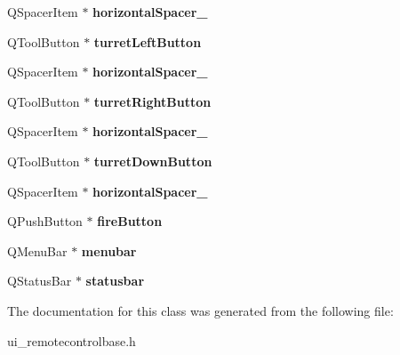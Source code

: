 \begin{DoxyCompactItemize}
\item 
\hypertarget{classUi__RemoteControlBase_ac94497ad40f449c39f453cabe81f50b5}{
QSpacerItem $\ast$ {\bfseries horizontalSpacer\_}}
\label{classUi__RemoteControlBase_ac94497ad40f449c39f453cabe81f50b5}

\item 
\hypertarget{classUi__RemoteControlBase_a1986fb2f1c46e8a727ce307b98bd8c71}{
QToolButton $\ast$ {\bfseries turretLeftButton}}
\label{classUi__RemoteControlBase_a1986fb2f1c46e8a727ce307b98bd8c71}

\item 
\hypertarget{classUi__RemoteControlBase_a4cb1365c46f2106f0e6f7c6354e8f8e2}{
QSpacerItem $\ast$ {\bfseries horizontalSpacer\_}}
\label{classUi__RemoteControlBase_a4cb1365c46f2106f0e6f7c6354e8f8e2}

\item 
\hypertarget{classUi__RemoteControlBase_af4c8e78432853f2d6f8dd5e0045b9d9e}{
QToolButton $\ast$ {\bfseries turretRightButton}}
\label{classUi__RemoteControlBase_af4c8e78432853f2d6f8dd5e0045b9d9e}

\item 
\hypertarget{classUi__RemoteControlBase_a7c41a09008867202255dc7ce1f00d891}{
QSpacerItem $\ast$ {\bfseries horizontalSpacer\_}}
\label{classUi__RemoteControlBase_a7c41a09008867202255dc7ce1f00d891}

\item 
\hypertarget{classUi__RemoteControlBase_a1cc402b191f0a9a73c47912b2f61dfa4}{
QToolButton $\ast$ {\bfseries turretDownButton}}
\label{classUi__RemoteControlBase_a1cc402b191f0a9a73c47912b2f61dfa4}

\item 
\hypertarget{classUi__RemoteControlBase_adf779a7f3877cb400ffaebf2aed66687}{
QSpacerItem $\ast$ {\bfseries horizontalSpacer\_}}
\label{classUi__RemoteControlBase_adf779a7f3877cb400ffaebf2aed66687}

\item 
\hypertarget{classUi__RemoteControlBase_a7d3d0bba0d81b0ce56919a084ddac858}{
QPushButton $\ast$ {\bfseries fireButton}}
\label{classUi__RemoteControlBase_a7d3d0bba0d81b0ce56919a084ddac858}

\item 
\hypertarget{classUi__RemoteControlBase_a117c0bfc42e16027c79879dbae08aff4}{
QMenuBar $\ast$ {\bfseries menubar}}
\label{classUi__RemoteControlBase_a117c0bfc42e16027c79879dbae08aff4}

\item 
\hypertarget{classUi__RemoteControlBase_a5ba62f2a5cef6b21703e102ed7a3e776}{
QStatusBar $\ast$ {\bfseries statusbar}}
\label{classUi__RemoteControlBase_a5ba62f2a5cef6b21703e102ed7a3e776}

\end{DoxyCompactItemize}


The documentation for this class was generated from the following file:\begin{DoxyCompactItemize}
\item 
ui\_\-remotecontrolbase.h\end{DoxyCompactItemize}
